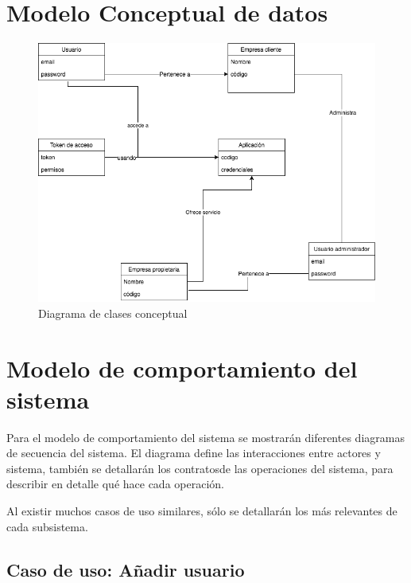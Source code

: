 \documentclass[12pt,a4paperpaper,]{report}
\begin{document}
\section{Modelo Conceptual de datos}\label{modelo-conceptual-de-datos}

\begin{figure}
\centering
\includegraphics{source/figures/diagrama-clases-conceptual.png}
\caption{Diagrama de clases conceptual
\label{diagrama_clases_conceptual}}
\end{figure}

\section{Modelo de comportamiento del
sistema}\label{modelo-de-comportamiento-del-sistema}

Para el modelo de comportamiento del sistema se mostrarán diferentes
diagramas de secuencia del sistema. El diagrama define las interacciones
entre actores y sistema, también se detallarán los contratosde las
operaciones del sistema, para describir en detalle qué hace cada
operación.

Al existir muchos casos de uso similares, sólo se detallarán los más
relevantes de cada subsistema.

\subsection{Caso de uso: Añadir
usuario}\label{caso-de-uso-auxf1adir-usuario-1}
\end{document}
